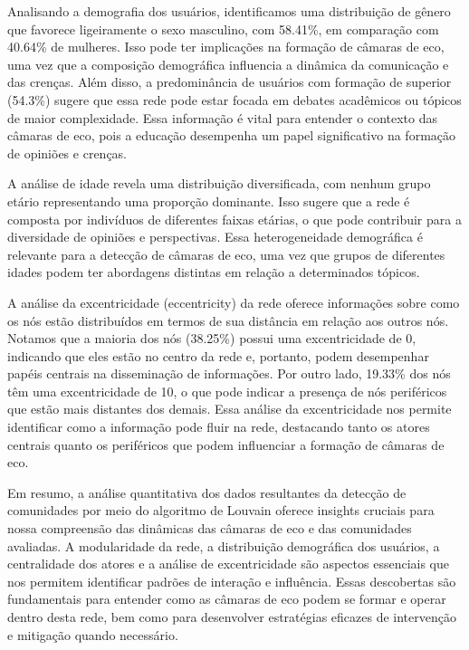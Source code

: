 Analisando a demografia dos usuários, identificamos uma distribuição de gênero que favorece ligeiramente o sexo masculino, com 58.41\%, em comparação com 40.64\% de mulheres. Isso pode ter implicações na formação de câmaras de eco, uma vez que a composição demográfica influencia a dinâmica da comunicação e das crenças. Além disso, a predominância de usuários com formação de superior (54.3\%) sugere que essa rede pode estar focada em debates acadêmicos ou tópicos de maior complexidade. Essa informação é vital para entender o contexto das câmaras de eco, pois a educação desempenha um papel significativo na formação de opiniões e crenças.

A análise de idade revela uma distribuição diversificada, com nenhum grupo etário representando uma proporção dominante. Isso sugere que a rede é composta por indivíduos de diferentes faixas etárias, o que pode contribuir para a diversidade de opiniões e perspectivas. Essa heterogeneidade demográfica é relevante para a detecção de câmaras de eco, uma vez que grupos de diferentes idades podem ter abordagens distintas em relação a determinados tópicos.

A análise da excentricidade (eccentricity) da rede oferece informações sobre como os nós estão distribuídos em termos de sua distância em relação aos outros nós. Notamos que a maioria dos nós (38.25\%) possui uma excentricidade de 0, indicando que eles estão no centro da rede e, portanto, podem desempenhar papéis centrais na disseminação de informações. Por outro lado, 19.33\% dos nós têm uma excentricidade de 10, o que pode indicar a presença de nós periféricos que estão mais distantes dos demais. Essa análise da excentricidade nos permite identificar como a informação pode fluir na rede, destacando tanto os atores centrais quanto os periféricos que podem influenciar a formação de câmaras de eco.

Em resumo, a análise quantitativa dos dados resultantes da detecção de comunidades por meio do algoritmo de Louvain oferece insights cruciais para nossa compreensão das dinâmicas das câmaras de eco e das comunidades avaliadas. A modularidade da rede, a distribuição demográfica dos usuários, a centralidade dos atores e a análise de excentricidade são aspectos essenciais que nos permitem identificar padrões de interação e influência. Essas descobertas são fundamentais para entender como as câmaras de eco podem se formar e operar dentro desta rede, bem como para desenvolver estratégias eficazes de intervenção e mitigação quando necessário.


